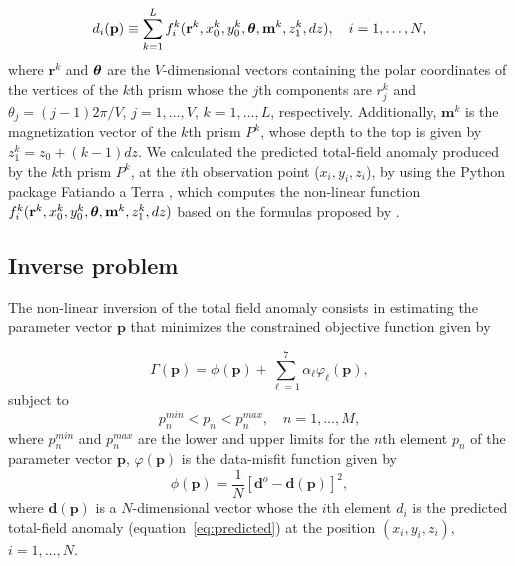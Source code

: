 \begin{equation}\label{eq:predicted}
d_i (\mathbf{p}) \equiv \sum\limits_{k=1}^L f_i^k(\mathbf{r}^k, x_0^k, y_0^k,\mbox{\boldmath$\theta$}, \mathbf{m}^k, z^k_1, dz), \quad i=1,\dots,N,
\end{equation}
where $\mathbf{r}^k$ and $\mbox{\boldmath$\theta$}$ are the $V$-dimensional vectors containing the polar coordinates of the vertices of the $k$th prism whose the $j$th components are $r^k_j$ and $\theta_j = (j-1)2\pi/V$, $j=1,\dots , V$, $k=1,\dots ,L$, respectively. Additionally, $\mathbf{m}^k$ is the magnetization vector of the $k$th prism $P^k$, whose depth to the top is given by $z_1^k = z_0 + (k-1)dz$. We calculated the predicted total-field anomaly produced by the $k$th prism $P^k$, at the $i$th observation point ($x_i, y_i, z_i$), by using the Python package Fatiando a Terra \citep{uieda-etal2013}, which computes the non-linear function $f_i^k(\mathbf{r}^k, x_0^k, y_0^k,\mbox{\boldmath$\theta$}, \mathbf{m}^k, z^k_1, dz)$ based on the formulas proposed by \cite{plouff1976}.

\subsection{Inverse problem}

The non-linear inversion of the total field anomaly consists in estimating the parameter vector $\mathbf{p}$ that minimizes the constrained objective function given by

\begin{equation}
\Gamma (\mathbf{p}) = \phi (\mathbf{p}) + \sum\limits^{7}_{\ell =1}\alpha_{\ell}\varphi_{\ell}(\mathbf{p}),
\label{eq:gamma}
\end{equation}
subject to
\begin{equation}\label{eq:desigualdade}
p_{n }^{min} < p_n < p_n^{max},\quad n =1, \dots, M,
\end{equation}
where $p_{n }^{min}$ and $p_n^{max}$ are the lower and upper limits for the $n$th element $p_n$ of the parameter vector $\mathbf{p}$, $\varphi (\mathbf{p})$ is the data-misfit function given by
\begin{equation}\label{eq:misfit}
\phi (\mathbf{p}) = \frac{1}{N}[\mathbf{d}^{o} - \mathbf{d}(\mathbf{p})]^2,
\end{equation}
where $\mathbf{d}(\mathbf{p})$ is a $N$-dimensional vector whose the $i$th element $d_i$ is the predicted total-field anomaly (equation~\ref{eq:predicted}) at the position $(x_i,y_i,z_i)$, $i = 1,\dots, N$.

